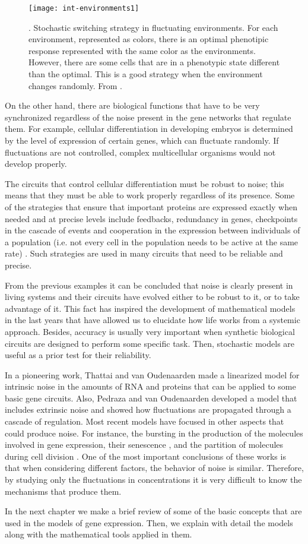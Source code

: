 \begin{figure}[H]
  \centering
  \texttt{[image: int-environments1]}
  \caption[Stochastic switching strategy in fluctuating environments]{\label{fig:int-environments1}. Stochastic switching strategy in fluctuating environments. For each environment, represented as colors, there is an optimal phenotipic response represented with the same color as the environments. However, there are some cells that are in a phenotypic state different than the optimal. This is a good strategy when the environment changes randomly. From \cite{kussell05}.}
\end{figure}

On the other hand, there are biological functions that have to be very synchronized regardless of the noise present in the gene networks that regulate them. For example, cellular differentiation in developing embryos is determined by the level of expression of certain genes, which can fluctuate randomly. If fluctuations are not controlled, complex multicellular organisms would not develop properly.

The circuits that control cellular differentiation must be robust to noise; this means that they must be able to work properly regardless of its presence. Some of the strategies that ensure that important proteins are expressed exactly when needed and at precise levels include feedbacks, redundancy in genes, checkpoints in the cascade of events and cooperation in the expression between individuals of a population (i.e. not every cell in the population needs to be active at the same rate) \cite{mcadams99}. Such strategies are used in many circuits that need to be reliable and precise.

From the previous examples it can be concluded that noise is clearly present in living systems and their circuits have evolved either to be robust to it, or to take advantage of it. This fact has inspired the development of mathematical models in the last years that have allowed us to elucidate how life works from a systemic approach. Besides, accuracy is usually very important when synthetic biological circuits are designed to perform some specific task. Then, stochastic models are useful as a prior test for their reliability.

In a pioneering work, Thattai and van Oudenaarden \cite{thattai01} made a linearized model for intrinsic noise in the amounts of RNA and proteins that can be applied to some basic gene circuits. Also, Pedraza and van Oudenaarden \cite{pedraza05} developed a model that includes extrinsic noise and showed how fluctuations are propagated through a cascade of regulation. Most recent models have focused in other aspects that could produce noise. For instance, the bursting in the production of the molecules involved in gene expression, their senescence \cite{pedraza08}, and the partition of molecules during cell division \cite{huh11a} \cite{huh11b}. One of the most important conclusions of these works is that when considering different factors, the behavior of noise is similar. Therefore, by studying only the fluctuations in concentrations it is very difficult to know the mechanisms that produce them.

In the next chapter we make a brief review of some of the basic concepts that are used in the models of gene expression. Then, we explain with detail the models along with the mathematical tools applied in them.

\renewcommand{\thefigure}{\arabic{chapter}.\arabic{section}.\arabic{figure}}
